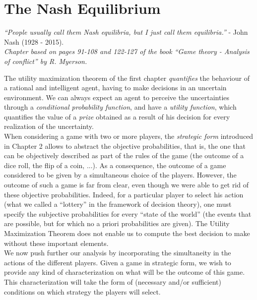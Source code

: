 \ifx \globalmark \undefined %
	
\else 	
\fi




\chapter{The Nash Equilibrium} \label{chap:Nash}
{\large{\itshape
``People usually call them Nash equilibria, but I just call them equilibria.''} - John Nash (1928 - 2015).\\
}
{\small{\itshape
Chapter based on pages 91-108 and 122-127 of the book  ``Game theory - Analysis of conflict'' by R. Myerson.}\\
}


The utility maximization theorem of the first chapter \emph{quantifies} the behaviour 
of a rational and intelligent agent, having to make decisions in an uncertain environment. 
We can always expect an agent to perceive the uncertainties through a \emph{conditional probability function}, and have a \emph{utility function}, 
which quantifies the value of a \emph{prize} obtained as a result of his decision for every realization of the uncertainty. \\
When considering a game with two or more players, the \emph{strategic form} introduced in Chapter 2 allows 
to abstract the objective probabilities, that is, the one that can be objectively described as part of the rules of the game (the outcome of a dice roll, the flip of a coin, ...). 
As a consequence,  the outcome of a game considered to be given by a simultaneous choice of the players.
However,
 the outcome of such a game is far from clear,
  even though we were able to get rid of these objective 
  probabilities.  
  Indeed, for a particular player to select his action
   (what we called a ``lottery'' in the framework of decision theory),
    one must specify the subjective probabilities 
    for every ``state of the world''
     (the events that are possible, but for which no a priori probabilities are given).
     The Utility Maximization Theorem does not enable us to compute the best decision to make without these important elements.
 \\
We now push further our analysis by 
incorporating the simultaneity in the actions of the 
different players. 
Given a game in strategic form,
 we wish to provide any kind of 
 characterization on what will be the outcome of this game. 
  This characterization will take the form of (necessary and/or sufficient) conditions on which strategy the players will select.  

